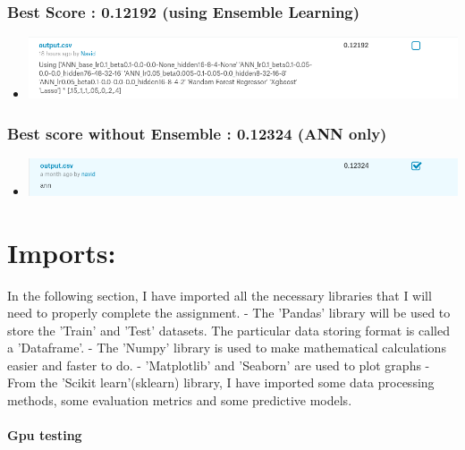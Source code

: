 \documentclass[11pt, a4paper , landscape]{article}
\makeatletter
\def\maxwidth{\ifdim\Gin@nat@width>\linewidth\linewidth
    \else\Gin@nat@width\fi}
\let\Oldincludegraphics\includegraphics
\renewcommand{\includegraphics}[1]{\Oldincludegraphics[width=.8\maxwidth]{#1}}
\providecommand{\tightlist}{%
      \setlength{\itemsep}{0pt}\setlength{\parskip}{0pt}}
\makeatother
\begin{document}
\subsubsection{Best Score : 0.12192 (using Ensemble
Learning)}\label{best-score-0.12192-using-ensemble-learning}

\begin{itemize}
\tightlist
\item
  \includegraphics{img/kaggle_score.png}
\end{itemize}

\subsubsection{Best score without Ensemble : 0.12324 (ANN
only)}\label{best-score-without-ensemble-0.12324-ann-only}

\begin{itemize}
\tightlist
\item
  \includegraphics{img/ann_base.png}
\end{itemize}

    \section{Imports:}\label{imports}

In the following section, I have imported all the necessary libraries
that I will need to properly complete the assignment. - The 'Pandas'
library will be used to store the 'Train' and 'Test' datasets. The
particular data storing format is called a 'Dataframe'. - The 'Numpy'
library is used to make mathematical calculations easier and faster to
do. - 'Matplotlib' and 'Seaborn' are used to plot graphs - From the
'Scikit learn'(sklearn) library, I have imported some data processing
methods, some evaluation metrics and some predictive models.

    \paragraph{Gpu testing}\label{gpu-testing}
\end{document}
